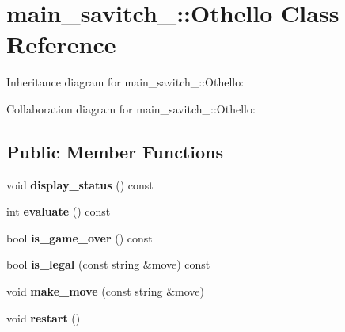 \hypertarget{classmain__savitch__14_1_1_othello}{}\section{main\+\_\+savitch\+\_\+:\+:Othello Class Reference}
\label{classmain__savitch__14_1_1_othello}


Inheritance diagram for main\+\_\+savitch\+\_\+:\+:Othello\+:


Collaboration diagram for main\+\_\+savitch\+\_\+:\+:Othello\+:
\subsection*{Public Member Functions}
\begin{DoxyCompactItemize}
\item 
void {\bfseries display\+\_\+status} () const \hypertarget{classmain__savitch__14_1_1_othello_a471f0e8f0e63ed32d764682f60110267}{}\label{classmain__savitch__14_1_1_othello_a471f0e8f0e63ed32d764682f60110267}

\item 
int {\bfseries evaluate} () const \hypertarget{classmain__savitch__14_1_1_othello_a1b3239a14882cbc7e7bd44c0b6828514}{}\label{classmain__savitch__14_1_1_othello_a1b3239a14882cbc7e7bd44c0b6828514}

\item 
bool {\bfseries is\+\_\+game\+\_\+over} () const \hypertarget{classmain__savitch__14_1_1_othello_a4387d20f953aab54025760ec3f72f7ca}{}\label{classmain__savitch__14_1_1_othello_a4387d20f953aab54025760ec3f72f7ca}

\item 
bool {\bfseries is\+\_\+legal} (const string \&move) const \hypertarget{classmain__savitch__14_1_1_othello_ab4fb0040d5e1dbe34c33fa11a82285cf}{}\label{classmain__savitch__14_1_1_othello_ab4fb0040d5e1dbe34c33fa11a82285cf}

\item 
void {\bfseries make\+\_\+move} (const string \&move)\hypertarget{classmain__savitch__14_1_1_othello_a1066b280efa5cb41039585669282fe06}{}\label{classmain__savitch__14_1_1_othello_a1066b280efa5cb41039585669282fe06}

\item 
void {\bfseries restart} ()\hypertarget{classmain__savitch__14_1_1_othello_abf872b8074bfa4c04119317dc3b39af2}{}\label{classmain__savitch__14_1_1_othello_abf872b8074bfa4c04119317dc3b39af2}


\end{DoxyCompactItemize}
